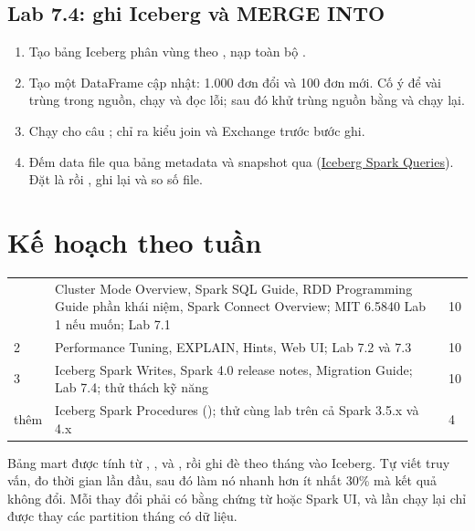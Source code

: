 \subsection{Lab 7.4: ghi Iceberg và MERGE INTO}
\begin{enumerate}
  \item Tạo bảng Iceberg  phân vùng theo , nạp toàn bộ .
  \item Tạo một DataFrame cập nhật: 1.000 đơn đổi  và 100 đơn mới. Cố ý để vài  trùng trong nguồn, chạy  và đọc lỗi; sau đó khử trùng nguồn bằng  và chạy lại.
  \item Chạy  cho câu ; chỉ ra kiểu join và Exchange trước bước ghi.
  \item Đếm data file qua bảng metadata  và snapshot qua  (\href{https://iceberg.apache.org/docs/latest/spark-queries/}{Iceberg Spark Queries}). Đặt  là  rồi , ghi lại và so số file.
\end{enumerate}

\section{Kế hoạch theo tuần}
\begin{xltabular}{\textwidth}{@{}P{1.4cm} L P{1.4cm}@{}}
\toprule
{} &  &  \\
\midrule
\endhead
\bottomrule
{} & Cluster Mode Overview, Spark SQL Guide, RDD Programming Guide phần khái niệm, Spark Connect Overview; MIT 6.5840 Lab 1 nếu muốn; Lab 7.1 & 10 \\
2 & Performance Tuning, EXPLAIN, Hints, Web UI; Lab 7.2 và 7.3 & 10 \\
3 & Iceberg Spark Writes, Spark 4.0 release notes, Migration Guide; Lab 7.4; thử thách kỹ năng & 10 \\
thêm & Iceberg Spark Procedures (); thử cùng lab trên cả Spark 3.5.x và 4.x & 4 \\
\end{xltabular}

\begin{thuthach}
Bảng mart  được tính từ , ,  và , rồi ghi đè theo tháng vào Iceberg. Tự viết truy vấn, đo thời gian lần đầu, sau đó làm nó nhanh hơn ít nhất 30\% mà kết quả không đổi. Mỗi thay đổi phải có bằng chứng từ  hoặc Spark UI, và lần chạy lại chỉ được thay các partition tháng có dữ liệu.
\end{thuthach}

